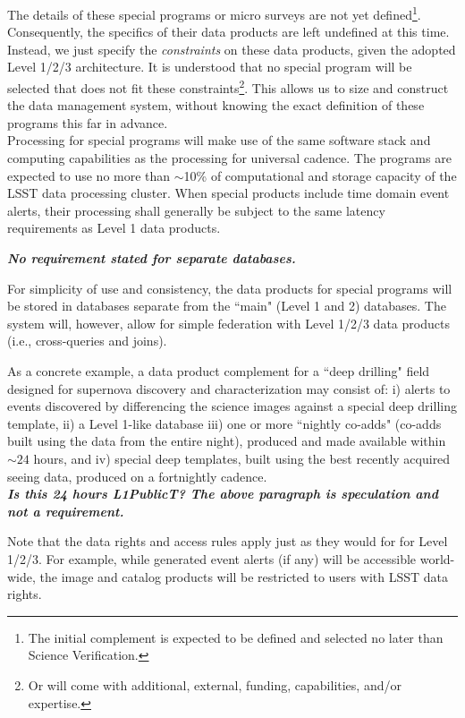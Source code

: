 \documentclass[12pt]{article}
\newcommand{\annotate}[1]{{\color{magenta}\large\textbf{\emph{#1}}}}
\newcommand{\req}[1]{\marginpar{\tiny #1}}
\begin{document}
The details of these special programs or micro surveys are not yet defined\footnote{The initial complement is expected to be defined and selected no later than Science Verification.}. Consequently, the specifics of their data products are left undefined at this time. Instead, we just specify the {\em constraints} on these data products, given the adopted Level 1/2/3 architecture. It is understood that no special program will be selected that does not fit these constraints\footnote{Or will come with additional, external, funding, capabilities, and/or expertise.}. This allows us to size and construct the data management system, without knowing the exact definition of these programs this far in advance.
\\

Processing for special programs will make use of the same software stack and computing capabilities as the processing for universal cadence. The programs are expected to use no more than $\sim$10\% of computational and storage capacity of the LSST data processing cluster. When special products include time domain event alerts, their processing shall generally be subject to the same latency requirements as Level 1 data products.

\annotate{No requirement stated for separate databases.}

For simplicity of use and consistency, the data products for special programs will be stored in databases separate from the ``main" (Level 1 and 2) databases. The system will, however, allow for simple federation with Level 1/2/3 data products (i.e., cross-queries and joins).

As a concrete example, a data product complement for a ``deep drilling" field designed for supernova discovery and characterization may consist of: i) alerts to events discovered by differencing the science images against a special deep drilling template, ii) a Level 1-like database iii) one or more ``nightly co-adds" (co-adds built using the data from the entire night), produced and made available within $\sim 24$ hours\req{L1PublicT}, and iv) special deep templates, built using the best recently acquired seeing data, produced on a fortnightly cadence.
\\

\annotate{Is this 24 hours L1PublicT? The above paragraph is speculation and not a requirement.}

Note that the data rights and access rules apply just as they would for for Level 1/2/3. For example, while generated event alerts (if any) will be accessible world-wide, the image and catalog products will be restricted to users with LSST data rights.
\end{document}
